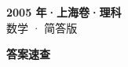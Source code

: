 \documentclass[zihao=-4, a4paper]{ctexart}
\begin{document}
\begin{center}
  {\Large\bfseries 2005 年·上海卷·理科}\\[4pt]
  {\large 数学 · 简答版}
\end{center}
\medskip
{}

\clearpage
{}
\begin{center}{\Large\bfseries 答案速查}\end{center}
\medskip

\end{document}

